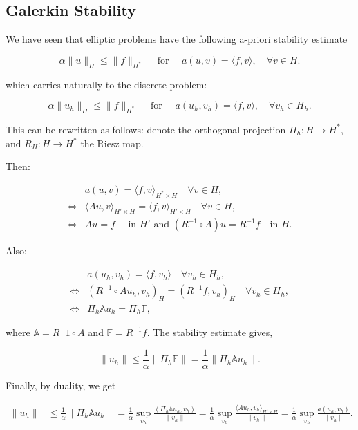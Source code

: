 \documentclass{article}
\begin{document}
\subsection{Galerkin Stability}

We have seen that elliptic problems have the following a-priori stability estimate

\[\alpha \|u\|_H \leq \|f\|_{H^*}\quad\text{ for }\quad a(u,v) = \langle f, v\rangle, \quad \forall v\in H.\]

which carries naturally to the discrete problem:

\[\alpha \|u_h\|_H \leq \|f\|_{H^*}\quad\text{ for }\quad a(u_h,v_h) = \langle f, v\rangle, \quad \forall v_h\in H_h.\]

This can be rewritten as follows: denote the orthogonal projection $\Pi_h: H\to H^*$, and $R_H:H\to H^*$ the Riesz map.

Then:

\begin{align*}
    &a(u,v) = \langle f, v\rangle_{H^*\times H}\quad \forall v\in H,\\
    \iff &\langle Au, v\rangle_{H'\times H} = \langle f, v\rangle_{H'\times H}\quad \forall v\in H,\\
    \iff &Au = f \quad\text{ in $H'$ and }(R^{-1}\circ A)u = R^{-1}f\quad\text{in }H.
\end{align*}

Also:

\begin{align*}
    &a(u_h,v_h) = \langle f, v_h\rangle\quad\forall v_h\in H_h,\\
    \iff &(R^{-1}\circ A u_h,v_h)_H = (R^{-1}f,v_h)_H\quad\forall v_h\in H_h,\\
    \iff &\Pi_h\mathbb{A}u_h = \Pi_h\mathbb{F},
\end{align*}

where $\mathbb{A} = R^-1\circ A$ and $\mathbb{F} = R^{-1}f$. The stability estimate gives, 

\[\|u_h\| \leq\frac{1}{\alpha}\|\Pi_h\mathbb{F}\| = \frac{1}{\alpha}\|\Pi_h\mathbb{A} u_h\|.\]

Finally, by duality, we get

\begin{align*}
    \|u_h\| &\leq \frac{1}{\alpha}\|\Pi_h\mathbb{A}u_h\| = \frac{1}{\alpha}\sup_{v_h}\frac{(\Pi_h\mathbb{A}u_h,v_h)}{\|v_h\|}
    =\frac{1}{\alpha}\sup_{v_h}\frac{\langle Au_h,v_h\rangle_{H'\times H}}{\|v_h\|} = \frac{1}{\alpha}\sup_{v_h}\frac{a(u_h,v_h)}{\|v_h\|}.
\end{align*}
\end{document}
